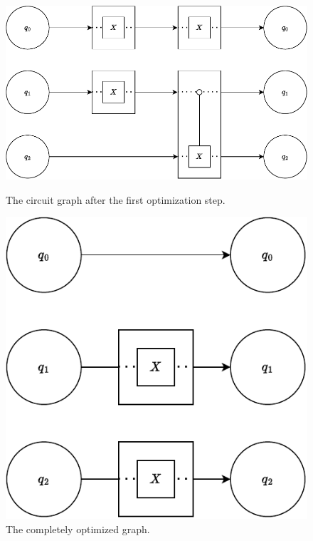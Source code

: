 \begin{figure}[htp]
    \centering     
    \begin{minipage}{.6\textwidth}
        \centering     
        \includegraphics[width=\textwidth]{../figures/drawio/circuit_graph_optimized_firststep.pdf}
        \caption{The circuit graph after the first optimization step.}
        \label{fig:circuit_graph_first_optimized}
    \end{minipage}
    \hfill
    \begin{minipage}{.35\textwidth}
        \centering     
        \includegraphics[width=\textwidth]{../figures/drawio/circuit_graph_optimized_complete.pdf}
        \caption{The completely optimized graph.}
        \label{fig:circuit_graph_optimized_complete}
    \end{minipage}
\end{figure}

